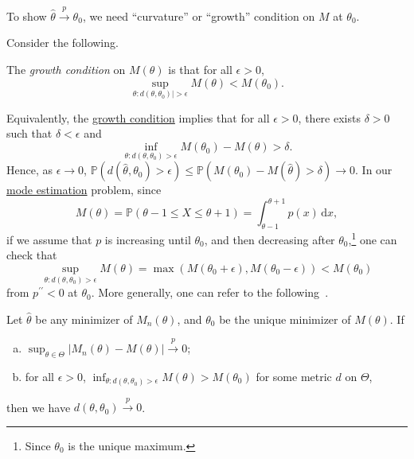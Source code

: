 To show \(\hat{\theta} \overset{p}{\to} \theta _0\), we need ``curvature'' or ``growth'' condition on \(M\) at \(\theta _0\).

\begin{center}
\end{center}

Consider the following.

\begin{definition}\label{def:growth-condition}
	The \emph{growth condition} on \(M(\theta )\) is that for all \(\epsilon > 0\),
	\[
		\sup _{\theta \colon d(\theta, \theta _0) \vert > \epsilon } M(\theta ) < M(\theta _0).
	\]
\end{definition}

Equivalently, the \hyperref[def:growth-condition]{growth condition} implies that for all \(\epsilon > 0\), there exists \(\delta > 0\) such that \(\delta < \epsilon \) and
\[
	\inf _{\theta \colon d(\theta, \theta _0 ) > \epsilon } M(\theta _0) - M(\theta ) > \delta .
\]
Hence, as \(\epsilon \to 0\), \(\mathbb{P} (d(\hat{\theta} , \theta _0 ) > \epsilon ) \leq \mathbb{P} (M(\theta _0) - M(\hat{\theta} ) > \delta ) \to 0\). In our \hyperref[prb:mode-estimation]{mode estimation} problem, since
\[
	M(\theta )
	= \mathbb{P} (\theta -1 \leq X \leq \theta +1)
	= \int_{\theta -1}^{\theta + 1} p(x) \,\mathrm{d}x,
\]
if we assume that \(p\) is increasing until \(\theta _0\), and then decreasing after \(\theta _0\),\footnote{Since \(\theta _0\) is the unique maximum.} one can check that
\[
	\sup _{\theta \colon d(\theta, \theta _0) > \epsilon } M(\theta )
	= \max (M(\theta _0 + \epsilon ), M(\theta _0 - \epsilon ))
	< M(\theta _0)
\]
from \(p^{\prime\prime} < 0\) at \(\theta _0\). More generally, one can refer to the following~\cite[Theorem 5.7]{vaartAsymptoticStatistics1998}.

\begin{theorem}\label{thm:lec20}
	Let \(\hat{\theta} \) be any minimizer of \(M_n(\theta )\), and \(\theta _0\) be the unique minimizer of \(M(\theta )\). If
	\begin{enumerate}[(a)]
		\item\label{thm:lec20-a} \(\sup _{\theta \in \Theta } \vert M_n(\theta ) - M(\theta ) \vert \overset{p}{\to } 0\);
		\item for all \(\epsilon >0\), \(\inf _{\theta \colon d(\theta , \theta _0) > \epsilon } M(\theta ) > M(\theta _0)\) for some metric \(d\) on \(\Theta \),
	\end{enumerate}
	then we have \(d(\theta , \theta _0) \overset{p}{\to } 0\).
\end{theorem}

